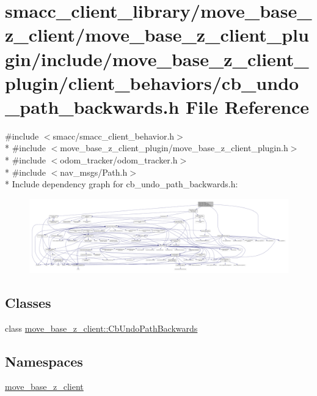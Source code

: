 \hypertarget{smacc__client__library_2move__base__z__client_2move__base__z__client__plugin_2include_2move__bascbc9ae7d3990516ddb2c98e15a09bcd2}{}\section{smacc\+\_\+client\+\_\+library/move\+\_\+base\+\_\+z\+\_\+client/move\+\_\+base\+\_\+z\+\_\+client\+\_\+plugin/include/move\+\_\+base\+\_\+z\+\_\+client\+\_\+plugin/client\+\_\+behaviors/cb\+\_\+undo\+\_\+path\+\_\+backwards.h File Reference}
\label{smacc__client__library_2move__base__z__client_2move__base__z__client__plugin_2include_2move__bascbc9ae7d3990516ddb2c98e15a09bcd2}
{\ttfamily \#include $<$smacc/smacc\+\_\+client\+\_\+behavior.\+h$>$}\\*
{\ttfamily \#include $<$move\+\_\+base\+\_\+z\+\_\+client\+\_\+plugin/move\+\_\+base\+\_\+z\+\_\+client\+\_\+plugin.\+h$>$}\\*
{\ttfamily \#include $<$odom\+\_\+tracker/odom\+\_\+tracker.\+h$>$}\\*
{\ttfamily \#include $<$nav\+\_\+msgs/\+Path.\+h$>$}\\*
Include dependency graph for cb\+\_\+undo\+\_\+path\+\_\+backwards.\+h\+:
\nopagebreak
\begin{figure}[H]
\begin{center}
\leavevmode
\includegraphics[width=350pt]{smacc__client__library_2move__base__z__client_2move__base__z__client__plugin_2include_2move__basa305a8b72697dc57f247f3d8b4ebcd95}
\end{center}
\end{figure}
\subsection*{Classes}
\begin{DoxyCompactItemize}
\item 
class \hyperlink{classmove__base__z__client_1_1CbUndoPathBackwards}{move\+\_\+base\+\_\+z\+\_\+client\+::\+Cb\+Undo\+Path\+Backwards}
\end{DoxyCompactItemize}
\subsection*{Namespaces}
\begin{DoxyCompactItemize}
\item 
 \hyperlink{namespacemove__base__z__client}{move\+\_\+base\+\_\+z\+\_\+client}
\end{DoxyCompactItemize}
